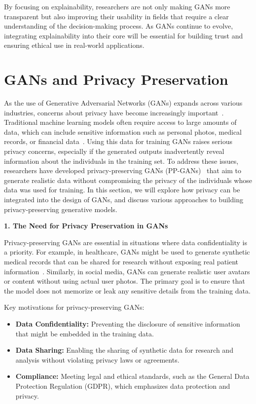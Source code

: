 By focusing on explainability, researchers are not only making GANs more transparent but also improving their usability in fields that require a clear understanding of the decision-making process. As GANs continue to evolve, integrating explainability into their core will be essential for building trust and ensuring ethical use in real-world applications.


\section{GANs and Privacy Preservation}

As the use of Generative Adversarial Networks (GANs) expands across various industries, concerns about privacy have become increasingly important~\cite{pan2019recent}. Traditional machine learning models often require access to large amounts of data, which can include sensitive information such as personal photos, medical records, or financial data~\cite{gan2021research}. Using this data for training GANs raises serious privacy concerns, especially if the generated outputs inadvertently reveal information about the individuals in the training set. To address these issues, researchers have developed privacy-preserving GANs (PP-GANs)~\cite{wu2019privacy} that aim to generate realistic data without compromising the privacy of the individuals whose data was used for training. In this section, we will explore how privacy can be integrated into the design of GANs, and discuss various approaches to building privacy-preserving generative models.

\textbf{1. The Need for Privacy Preservation in GANs}

Privacy-preserving GANs are essential in situations where data confidentiality is a priority. For example, in healthcare, GANs might be used to generate synthetic medical records that can be shared for research without exposing real patient information~\cite{wu2019privacy}. Similarly, in social media, GANs can generate realistic user avatars or content without using actual user photos. The primary goal is to ensure that the model does not memorize or leak any sensitive details from the training data.

Key motivations for privacy-preserving GANs:
\begin{itemize}
    \item \textbf{Data Confidentiality:} Preventing the disclosure of sensitive information that might be embedded in the training data.
    \item \textbf{Data Sharing:} Enabling the sharing of synthetic data for research and analysis without violating privacy laws or agreements.
    \item \textbf{Compliance:} Meeting legal and ethical standards, such as the General Data Protection Regulation (GDPR), which emphasizes data protection and privacy.
\end{itemize}


